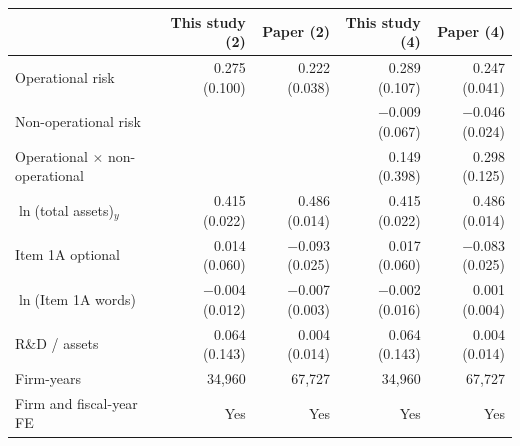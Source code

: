 \begin{tabular}{lrrrr}
\toprule
 & This study (2) & Paper (2) & This study (4) & Paper (4) \\
\midrule
Operational risk & 0.275 (0.100) & 0.222 (0.038) & 0.289 (0.107) & 0.247 (0.041) \\
Non-operational risk &  &  & \ensuremath{-}0.009 (0.067) & \ensuremath{-}0.046 (0.024) \\
Operational $\times$ non-operational &  &  & 0.149 (0.398) & 0.298 (0.125) \\
$\ln$(total assets)$_{y}$ & 0.415 (0.022) & 0.486 (0.014) & 0.415 (0.022) & 0.486 (0.014) \\
Item 1A optional & 0.014 (0.060) & \ensuremath{-}0.093 (0.025) & 0.017 (0.060) & \ensuremath{-}0.083 (0.025) \\
$\ln$(Item 1A words) & \ensuremath{-}0.004 (0.012) & \ensuremath{-}0.007 (0.003) & \ensuremath{-}0.002 (0.016) & 0.001 (0.004) \\
R\&D / assets & 0.064 (0.143) & 0.004 (0.014) & 0.064 (0.143) & 0.004 (0.014) \\
Firm-years & 34{,}960 & 67{,}727 & 34{,}960 & 67{,}727 \\
Firm and fiscal-year FE & Yes & Yes & Yes & Yes \\
\bottomrule
\end{tabular}

